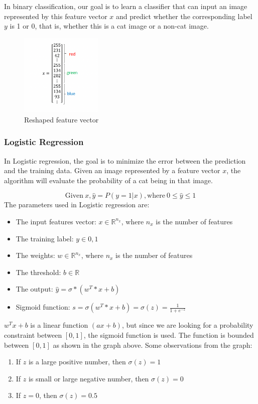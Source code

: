 \documentclass[letterpaper,12pt,notitlepage,twoside]{report}
\begin{document}
\begin{example}
     In binary classification, our goal is to learn a classifier that can input an image represented by this feature vector $x$ and predict whether the corresponding label $y$ is 1 or 0, that is, whether this is a cat image or a non-cat image. 
\end{example}

\begin{figure}[h]
	\centering
	\includegraphics[width=0.35\textwidth]{Images/Reshaped feature vector.png}
	\caption{Reshaped feature vector}
	\label{fig:6}
\end{figure}
\FloatBarrier

\subsubsection{Logistic Regression}
In Logistic regression, the goal is to minimize the error between the prediction and the training data. Given an image represented by a feature vector $x$, the algorithm will evaluate the probability of a cat being in that image.

\begin{equation}
\text{Given}~ x , \hat{y} = P(y=1|x), \text{where}~0 \leq \hat{y} \leq 1
\end{equation}
The parameters used in Logistic regression are:
\begin{itemize}[nosep]
\item The input features vector: $x \in \mathbb{R}^{n_x}$, where $n_x$ is the number of features
\item The training label: $y \in 0,1$
\item The weights: $w \in \mathbb{R}^{n_x}$, where $n_x$ is the number of features
\item The threshold: $b \in \mathbb{R}$
\item The output: $\hat{y} = \sigma*(w^T*x+b)$
\item Sigmoid function: $s = \sigma(w^T*x+b) = \sigma(z)= \frac{1}{1+e^{-z}}$
\end{itemize}
$w^Tx+b$ is a linear function $(ax+b)$, but since we are looking for a probability constraint between $[0,1]$, the sigmoid function is used. The function is bounded between $[0,1]$ as shown in the graph above.
Some observations from the graph:
\begin{enumerate}[nosep]
\item If $z$ is a large positive number, then $\sigma(z) = 1$
\item If $z$ is small or large negative number, then $\sigma(z) = 0$
\item If $z=0$, then $\sigma(z) = 0.5$
\end{enumerate}
\end{document}
